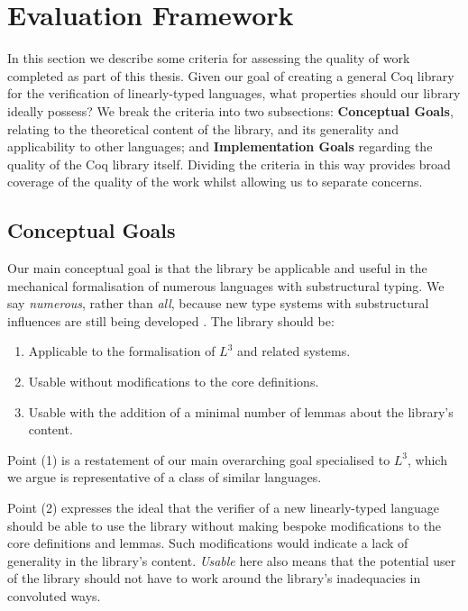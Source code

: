 \documentclass[]{unswthesis}
\let\i\textit
\let\b\textbf
\begin{document}
\section{Evaluation Framework}
\label{sec:eval-framework}

In this section we describe some criteria for assessing the quality of work completed as part of this thesis. Given our goal of creating a general Coq library for the verification of linearly-typed languages, what properties should our library ideally possess? We break the criteria into two subsections: \b{Conceptual Goals}, relating to the theoretical content of the library, and its generality and applicability to other languages; and \b{Implementation Goals} regarding the quality of the Coq library itself. Dividing the criteria in this way provides broad coverage of the quality of the work whilst allowing us to separate concerns.

\subsection{Conceptual Goals}

Our main conceptual goal is that the library be applicable and useful in the mechanical formalisation of numerous languages with substructural typing. We say \i{numerous}, rather than \i{all}, because new type systems with substructural influences are still being developed \cite{mcbride16}. The library should be:

\begin{enumerate}
\item Applicable to the formalisation of $L^3$ and related systems.
\item Usable without modifications to the core definitions.
\item Usable with the addition of a minimal number of lemmas about the library's content.
\end{enumerate}

Point (1) is a restatement of our main overarching goal specialised to $L^3$, which we argue is representative of a class of similar languages.

Point (2) expresses the ideal that the verifier of a new linearly-typed language should be able to use the library without making bespoke modifications to the core definitions and lemmas. Such modifications would indicate a lack of generality in the library's content. \i{Usable} here also means that the potential user of the library should not have to work around the library's inadequacies in convoluted ways.
\end{document}
